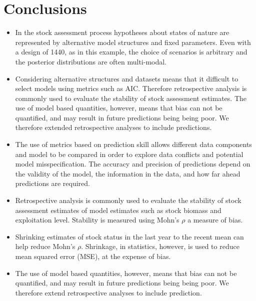 \section{Conclusions}

\begin{itemize}
    \item In the stock assessment process hypotheses about states of nature are represented by alternative model structures and fixed parameters. Even with a design of 1440, as in this example, the choice of scenarios is arbitrary and the posterior distributions are often multi-modal.
    
    \item Considering alternative structures and datasets means that it difficult to select models using metrics such as AIC. Therefore retrospective analysis is commonly used to evaluate the stability of stock assessment estimates.  The use of model based quantities, however, means that bias can not be quantified, and may result in future predictions being being poor. We therefore extended retrospective analyses to include predictions. 
   
    \item The use of metrics based on prediction skill allows different data components and model to be compared in order to explore data conflicts and potential model misspecification. The accuracy and precision of predictions depend on the validity of the model, the information in the data, and how far ahead predictions are required. 
   
    \item Retrospective analysis is commonly used to evaluate the stability of stock assessment estimates of model estimates such as stock biomass and exploitation level. Stability is measured using Mohn's $\rho$ a measure of bias. 
    
    \item Shrinking estimates of stock status in the last year to the recent mean can help reduce Mohn's $\rho$. Shrinkage, in statistics, however, is used to reduce mean squared error (MSE), at the expense of bias. 
    
    \item The use of model based quantities, however, means that bias can not be quantified, and may result in future predictions being being poor. We therefore extend retrospective analyses to include prediction. 

     

\end{itemize}
